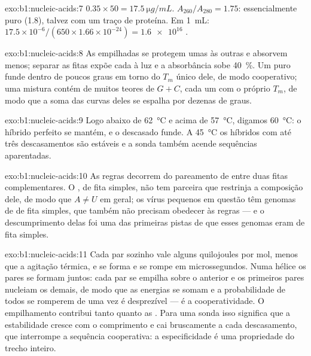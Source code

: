 \begin{solution}{exo:b1:nucleic-acids:7}
$0.35\times 50 = \qty{17.5}{\micro g/mL}$. $A_{260}/A_{280} = 1.75$:
 essencialmente puro (1.8), talvez com um traço de proteína. Em
\qty{1}{mL}: $17.5\times 10^{-6}/(650\times 1.66\times 10^{-24}) =
\num{1.6e16}$ .
\end{solution}

\begin{solution}{exo:b1:nucleic-acids:8}
As  empilhadas se protegem umas às outras e absorvem menos;
separar as fitas expõe cada  à luz e a absorbância sobe
\qty{40}{\%}. Um  puro funde dentro de poucos graus em torno do
$T_m$ único dele, de modo cooperativo; uma mistura contém  de muitos
teores de $G + C$, cada um com o próprio $T_m$, de modo que a soma das
curvas deles se espalha por dezenas de graus.
\end{solution}

\begin{solution}{exo:b1:nucleic-acids:9}
Logo abaixo de \qty{62}{\celsius} e acima de \qty{57}{\celsius},
digamos \qty{60}{\celsius}: o híbrido perfeito se mantém, e o descasado
funde. A \qty{45}{\celsius} os híbridos com até três descasamentos são
estáveis e a sonda também acende sequências aparentadas.
\end{solution}

\begin{solution}{exo:b1:nucleic-acids:10}
As regras decorrem do pareamento de  entre duas fitas
complementares. O , de fita simples, não tem parceira que restrinja a
composição dele, de modo que $A \neq U$ em geral; os vírus pequenos em
questão têm genomas de  de fita simples, que também não precisam
obedecer às regras --- e o descumprimento delas foi uma das primeiras
pistas de que esses genomas eram de fita simples.
\end{solution}

\begin{solution}{exo:b1:nucleic-acids:11}
Cada par sozinho vale alguns quilojoules por mol, menos que a agitação
térmica, e se forma e se rompe em microssegundos. Numa hélice os pares
se formam juntos: cada par se empilha sobre o anterior e os primeiros
pares nucleiam os demais, de modo que as energias se somam e a
probabilidade de todos se romperem de uma vez é desprezível --- é a
cooperatividade. O empilhamento contribui tanto quanto as . Para uma sonda isso significa que a estabilidade cresce com
o comprimento e cai bruscamente a cada descasamento, que interrompe a
sequência cooperativa: a especificidade é uma propriedade do trecho
inteiro.
\end{solution}

